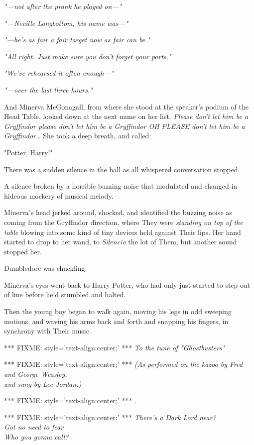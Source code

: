 \emph{"---not after the prank he played on---"}

\emph{"---Neville Longbottom, his name was---"}

\emph{"---he's as fair a fair target now as fair can be."}

\emph{"All right. Just make sure you don't forget your parts."}

\emph{"We've rehearsed it often enough---"}

\emph{"---over the last three hours."}

And Minerva McGonagall, from where she stood at the speaker's podium of the 
Head Table, looked down at the next name on her list. \emph{Please don't let 
him be a Gryffindor please don't let him be a Gryffindor OH PLEASE don't let 
him be a Gryffindor{\ldots}} She took a deep breath, and called:

"Potter, Harry!"

There was a sudden silence in the hall as all whispered conversation stopped.

A silence broken by a horrible buzzing noise that modulated and changed in 
hideous mockery of musical melody.

Minerva's head jerked around, shocked, and identified the buzzing noise as 
coming from the Gryffindor direction, where They were \emph{standing on top of 
the table} blowing into some kind of tiny devices held against Their lips. Her 
hand started to drop to her wand, to \emph{Silencio} the lot of Them, but 
another sound stopped her.

Dumbledore was chuckling.

Minerva's eyes went back to Harry Potter, who had only just started to step out 
of line before he'd stumbled and halted.

Then the young boy began to walk again, moving his legs in odd sweeping 
motions, and waving his arms back and forth and snapping his fingers, in 
synchrony with Their music.

*** FIXME: style='text-align:center;' ***
\emph{To the tune of "Ghostbusters"}

*** FIXME: style='text-align:center;' ***
\emph{(As performed on the kazoo by Fred and George Weasley,\\
and sung by Lee Jordan.)}

*** FIXME: style='text-align:center;' ***
\emph{.}

*** FIXME: style='text-align:center;' ***
\emph{There's a Dark Lord near?\\
Got no need to fear\\
Who you gonna call?}

